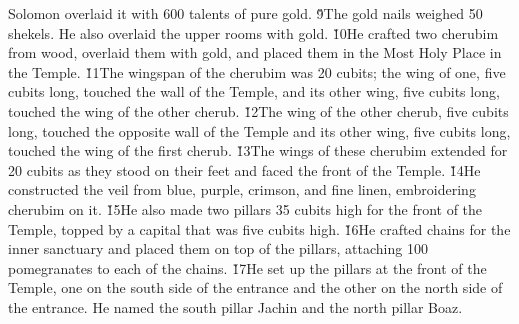 Solomon overlaid it with 600 talents of pure gold. \v{9}The gold nails weighed 50 shekels. He also overlaid the upper rooms with gold. \v{10}He crafted two cherubim from wood, overlaid them with gold, and placed them in the Most Holy Place in the Temple. \v{11}The wingspan of the cherubim was 20 cubits; the wing of one, five cubits long, touched the wall of the Temple, and its other wing, five cubits long, touched the wing of the other cherub. \v{12}The wing of the other cherub, five cubits long, touched the opposite wall of the Temple and its other wing, five cubits long, touched the wing of the first cherub. \v{13}The wings of these cherubim extended for 20 cubits as they stood on their feet and faced the front of the Temple. \v{14}He constructed the veil from blue, purple, crimson, and fine linen, embroidering cherubim on it. \v{15}He also made two pillars 35 cubits high for the front of the Temple, topped by a capital that was five cubits high. \v{16}He crafted chains for the inner sanctuary and placed them on top of the pillars, attaching 100 pomegranates to each of the chains. \v{17}He set up the pillars at the front of the Temple, one on the south side of the entrance and the other on the north side of the entrance. He named the south pillar Jachin and the north pillar Boaz.


